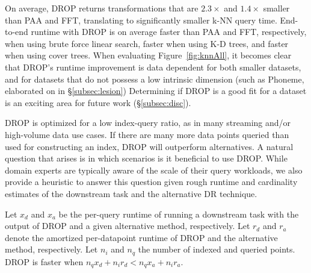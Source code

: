 On average, DROP returns transformations that are $2.3\times$ and  $1.4\times$ smaller than PAA and FFT, translating to significantly smaller k-NN query time. 
End-to-end runtime with DROP is on average  faster than PAA and FFT, respectively, when using brute force linear search,    faster when using K-D trees, and  faster when using cover trees.
When evaluating Figure~\ref{fig:knnAll}, it becomes clear that DROP's runtime improvement is data dependent for both smaller datasets, and for datasets that do not possess a low intrinsic dimension (such as Phoneme, elaborated on in \S\ref{subsec:lesion})
Determining if DROP is a good fit for a dataset is an exciting area for future work (\S\ref{subsec:disc}).




DROP is optimized for a low index-query ratio, as in many streaming and/or high-volume data use cases.
If there are many more data points queried than used for constructing an index, DROP will outperform alternatives. 
A natural question that arises is in which scenarios is it beneficial to use DROP. 
While domain experts are typically aware of the scale of their query workloads, we also provide a heuristic to answer this question given rough runtime and cardinality estimates of the downstream task and the alternative DR technique.

Let $x_d$ and $x_a$ be the per-query runtime of running a downstream task with the output of DROP and a given alternative method, respectively. 
Let $r_d$ and $r_a$ denote the amortized per-datapoint runtime of DROP and the alternative method, respectively. 
Let $n_i$ and $n_q$ the number of indexed and queried points. 
DROP is faster when $n_q x_d + n_i r_d < n_q x_a + n_i r_a$.

